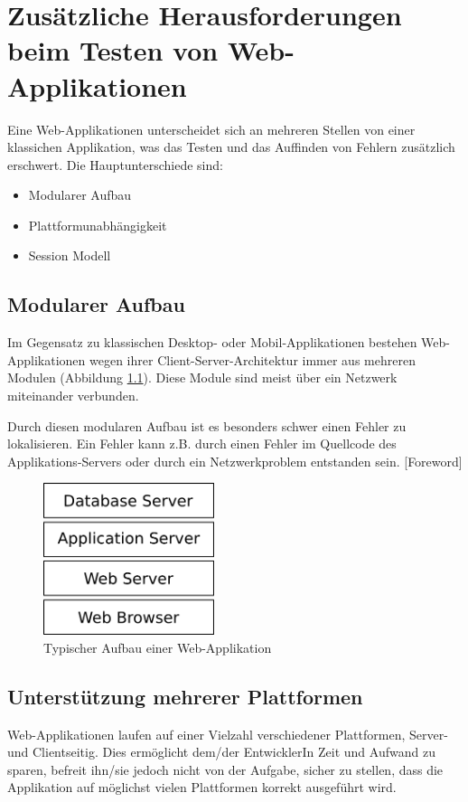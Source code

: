 \documentclass[a4paper,bibtotoc,oneside]{scrbook}
\begin{document}
\chapter{Zusätzliche Herausforderungen beim Testen von Web-Applikationen}
Eine Web-Applikationen unterscheidet sich an mehreren Stellen von einer klassichen Applikation, was das Testen und das Auffinden von Fehlern zusätzlich erschwert. Die Hauptunterschiede sind:

\begin{itemize}
	\item Modularer Aufbau
	\item Plattformunabhängigkeit
	\item Session Modell
\end{itemize}


\section{Modularer Aufbau}

Im Gegensatz zu klassischen Desktop- oder Mobil-Applikationen bestehen Web-Applikationen wegen ihrer Client-Server-Architektur immer aus mehreren Modulen (Abbildung \ref{Abb4}). Diese Module sind meist über ein Netzwerk miteinander verbunden.

Durch diesen modularen Aufbau ist es besonders schwer einen Fehler zu lokalisieren. Ein Fehler kann z.B. durch einen Fehler im Quellcode des Applikations-Servers oder durch ein Netzwerkproblem entstanden sein. \cite{testing_apps_on_web}[Foreword]

\begin{figure}[h!]
\centering
\includegraphics[width=50mm]{img/webstack.png}
\caption[Typischer Aufbau einer Web-Applikation]{Typischer Aufbau einer Web-Applikation}\label{Abb4}
\end{figure}

\section{Unterstützung mehrerer Plattformen}
Web-Applikationen laufen auf einer Vielzahl verschiedener Plattformen, Server- und Clientseitig. Dies ermöglicht dem/der EntwicklerIn Zeit und Aufwand zu sparen, befreit ihn/sie jedoch nicht von der Aufgabe, sicher zu stellen, dass die Applikation auf möglichst vielen Plattformen korrekt ausgeführt wird.
\end{document}
